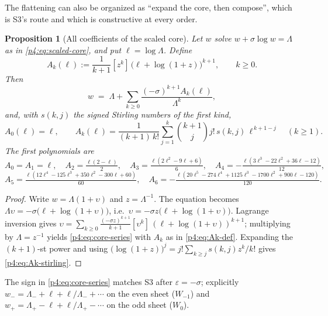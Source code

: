 \documentclass[11pt,a4paper,oneside]{book}
\theoremstyle{plain}
\newtheorem{proposition}[theorem]{Proposition}
\theoremstyle{definition}
\theoremstyle{remark}
\newcommand{\Coef}[1]{[#1]\,}
\newcommand{\Wlam}{W}
\begin{document}
The flattening can also be organized as ``expand the core, then compose'',
which is \textsf{S3}'s route and which is constructive at every order.

\begin{proposition}[All coefficients of the scaled core]
\label{p4:prop:core-series}
Let $w$ solve $w+\sigma\log w=\Lambda$ as in \cref{p4:eq:scaled-core}, and
put $\ell=\log\Lambda$.  Define
\begin{equation}
  A_k(\ell):=\frac1{k+1}\Coef{z^{k}}\bigl(\ell+\log(1+z)\bigr)^{k+1},
  \qquad k\ge0 .
  \label{p4:eq:Ak-def}
\end{equation}
Then
\begin{equation}
  w\;=\;\Lambda+\sum_{k\ge0}\frac{(-\sigma)^{k+1}A_k(\ell)}{\Lambda^{k}},
  \label{p4:eq:core-series}
\end{equation}
and, with $s(k,j)$ the signed Stirling numbers of the first kind,
\begin{equation}
  A_0(\ell)=\ell,
  \qquad
  A_k(\ell)=\frac1{(k+1)\,k!}\sum_{j=1}^{k}\binom{k+1}{j}j!\,s(k,j)\,
  \ell^{\,k+1-j}\quad(k\ge1).
  \label{p4:eq:Ak-stirling}
\end{equation}
The first polynomials are
\[
  A_0=A_1=\ell,\quad
  A_2=\tfrac{\ell(2-\ell)}2,\quad
  A_3=\tfrac{\ell(2\ell^{2}-9\ell+6)}6,\quad
  A_4=-\tfrac{\ell(3\ell^{3}-22\ell^{2}+36\ell-12)}{12},
\]
\[
  A_5=\tfrac{\ell(12\ell^{4}-125\ell^{3}+350\ell^{2}-300\ell+60)}{60},
  \quad
  A_6=-\tfrac{\ell(20\ell^{5}-274\ell^{4}+1125\ell^{3}-1700\ell^{2}
    +900\ell-120)}{120} .
\]
\end{proposition}

\begin{proof}
Write $w=\Lambda(1+\upsilon)$ and $z=\Lambda^{-1}$.  The equation becomes
$\Lambda\upsilon=-\sigma\bigl(\ell+\log(1+\upsilon)\bigr)$, i.e.\
$\upsilon=-\sigma z\bigl(\ell+\log(1+\upsilon)\bigr)$.  Lagrange inversion
gives
$\upsilon=\sum_{k\ge0}\frac{(-\sigma z)^{k+1}}{k+1}
\Coef{\upsilon^{k}}(\ell+\log(1+\upsilon))^{k+1}$; multiplying by
$\Lambda=z^{-1}$ yields \cref{p4:eq:core-series} with $A_k$ as in
\cref{p4:eq:Ak-def}.  Expanding the $(k+1)$-st power and using
$\bigl(\log(1+z)\bigr)^{j}=j!\sum_{k\ge j}s(k,j)z^{k}/k!$ gives
\cref{p4:eq:Ak-stirling}.
\end{proof}

The sign in \cref{p4:eq:core-series} matches \textsf{S3} after
$\varepsilon=-\sigma$; explicitly $w_-=\Lambda_-+\ell+\ell/\Lambda_-+\cdots$
on the even sheet ($\Wlam_{-1}$) and
$w_+=\Lambda_+-\ell+\ell/\Lambda_+-\cdots$ on the odd sheet ($\Wlam_0$).
\end{document}
